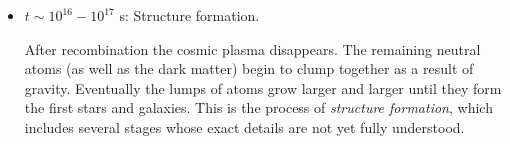 \begin{itemize}
\item $t\sim 10^{16}-10^{17}$ s: Structure formation.

After recombination the cosmic plasma disappears. The remaining neutral atoms (as well as the dark matter) begin to clump together as a result of gravity. Eventually the lumps of atoms grow larger and larger until they form the first stars and galaxies. This is the process of {\it structure formation}, which includes several stages whose exact details are not yet fully understood.

\end{itemize}